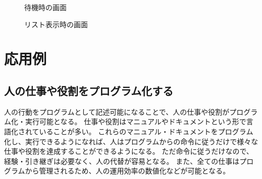 \documentclass{deimj}
\begin{document}
\begin{figure}[tb]
  \begin{center}
    \caption{待機時の画面}
    \label{babascript-wait}
  \end{center}
\end{figure}
\begin{figure}[tb]
  \begin{center}
    \caption{リスト表示時の画面}
    \label{babascript-list}
  \end{center}
\end{figure}



\section{応用例}
\subsection{人の仕事や役割をプログラム化する}
人の行動をプログラムとして記述可能になることで、人の仕事や役割がプログラム化・実行可能となる。
仕事や役割はマニュアルやドキュメントという形で言語化されていることが多い。
これらのマニュアル・ドキュメントをプログラム化し、実行できるようになれば、人はプログラムからの命令に従うだけで様々な仕事や役割を達成することができるようになる。
ただ命令に従うだけなので、経験・引き継ぎは必要なく、人の代替が容易となる。
また、全ての仕事はプログラムから管理されるため、人の運用効率の数値化などが可能となる。
\end{document}
